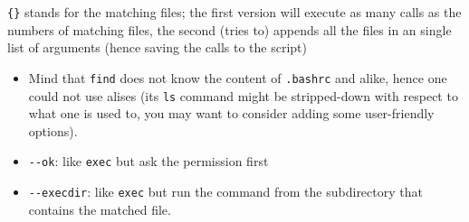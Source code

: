 \documentclass[a4paper,12pt,%
              final%
              ]{article}
\begin{document}
\begin{itemize}
\verb|{}| stands for the matching files; the first version will execute as many calls as the numbers of matching files, the second (tries to) appends all the files in an single list of arguments (hence saving the calls to the script)
  \begin{itemize}
    \item Mind that \texttt{find} does not know the content of \texttt{.bashrc} and alike, hence one could not use alises (its \texttt{ls} command might be stripped-down with respect to what one is used to, you may want to consider adding some user-friendly options).
  \end{itemize}
  \begin{itemize}
    \item \verb|--ok|: like \texttt{exec} but ask the permission first
    \item \verb|--execdir|: like \texttt{exec} but run the command from the subdirectory that contains the matched file.
  \end{itemize}
\end{itemize}
\end{document}
